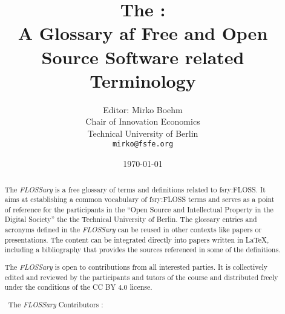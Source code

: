 \documentclass[a4paper]{article}
\title{The \flossary:\\
  A Glossary af Free and Open Source Software related Terminology}
\author{Editor: Mirko Boehm\\
  Chair of Innovation Economics\\
  Technical University of Berlin\\
  \texttt{mirko@fsfe.org}}
\date{\today}
\newcommand{\flossary}{{\em FLOSSary} }
\begin{document}
\maketitle \thispagestyle{empty}
\begin{abstract}
  \noindent
  The \flossary is a free glossary of terms and definitions related to
  \gls{fsry:FLOSS}. It aims at establishing a common vocabulary of
  \gls{fsry:FLOSS} terms and serves as a point of reference for the
  participants in the ``Open Source and Intellectual Property in the
  Digital Society'' the the Technical University of Berlin. The
  glossary entries and acronyms defined in the \flossary can be reused
  in other contexts like papers or presentations. The content can be
  integrated directly into papers written in \LaTeX, including a
  bibliography that provides the sources referenced in some of the
  definitions.

  The \flossary is open to contributions from all interested
  parties. It is collectively edited and reviewed by the participants
  and tutors of the course and distributed freely under the conditions
  of the CC BY 4.0 license.

  \vspace{0.5cm}
  \noindent \textcopyright~The \flossary Contributors \ccby:
  \\ 
\end{abstract}

\clearpage
\glsaddall
{}
\printnoidxglossary[nonumberlist]
\clearpage
\printnoidxglossary[type=\acronymtype,nonumberlist]
\clearpage

\end{document}
